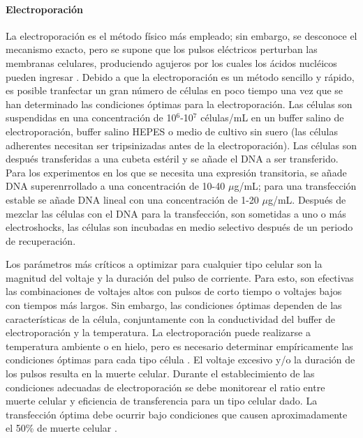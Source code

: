 \documentclass[fleqn,10pt]{SelfArx} %
\begin{document}
\paragraph*{Electroporación}
La electroporación es el método físico más empleado; sin embargo, se desconoce el mecanismo exacto, pero se supone que los pulsos eléctricos perturban las membranas celulares, produciendo agujeros por los cuales los ácidos nucléicos pueden ingresar \cite{Inoue:2001aa}. Debido a que la electroporación es un método sencillo y rápido, es posible tranfectar un gran número de células en poco tiempo una vez que se han determinado las condiciones óptimas para la electroporación.  Las células son suspendidas en una concentración de 10$^6$-10$^7$ células/mL en un buffer salino de electroporación, buffer salino HEPES o medio de cultivo sin suero (las células adherentes necesitan ser tripsinizadas antes de la electroporación). Las células son después transferidas a una cubeta estéril y se añade el DNA a ser transferido. Para los experimentos en los que se necesita una expresión transitoria, se añade DNA superenrrollado a una concentración de 10-40 $\mu$g/mL; para una transfección estable se añade DNA lineal con una concentración de 1-20 $\mu$g/mL.  Después de mezclar las células con el DNA para la transfección, son sometidas a uno o más electroshocks, las células son incubadas en medio selectivo después de un periodo de recuperación. 

Los parámetros más críticos a optimizar para cualquier tipo celular son la magnitud del voltaje y la duración del pulso de corriente. Para esto, son efectivas las combinaciones de voltajes altos con pulsos de corto tiempo o voltajes bajos con tiempos más largos. Sin embargo, las condiciones óptimas dependen de las características de la célula, conjuntamente con la conductividad del buffer de electroporación y la temperatura. La electroporación puede realizarse a temperatura ambiente o en hielo, pero es necesario determinar empíricamente las condiciones óptimas para cada tipo célula \cite{Chu11021987}.  El voltaje excesivo y/o la duración de los pulsos resulta en la muerte celular. Durante el establecimiento de las condiciones adecuadas  de electroporación se debe monitorear el ratio entre muerte celular y eficiencia de transferencia para un tipo celular dado. La transfección óptima debe ocurrir bajo condiciones que  causen aproximadamente el 50\% de muerte celular \cite{Schenborn}.
\end{document}
